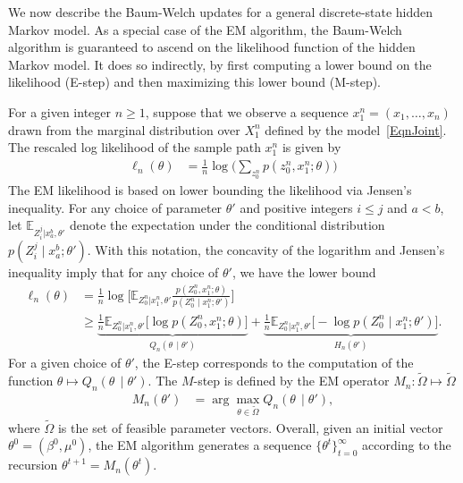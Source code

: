 \documentclass[twoside,11pt]{article}
\newcommand{\numobs}{\ensuremath{n}}
\def\EE{ \mathbb{E} }
\newcommand{\EEzcondx}[3]{\ensuremath{\EE_{#1|#2,#3}}}
\newcommand{\paramobs}{\mu}
\newcommand{\paramtrans}{\beta}
\newcommand{\paramjoint}{\theta}
\newcommand{\paramtransit}[1]{\ensuremath{\paramtrans^{#1}}}
\newcommand{\paramobsit}[1]{\ensuremath{\paramobs^{#1}}}
\newcommand{\paramjointit}[1]{\ensuremath{\theta^{#1}}}
\newcommand{\MFUNSAM}{\ensuremath{M_\numobs}}
\newcommand{\LikeSample}{\ensuremath{\ell_\numobs}}
\newcommand{\hprob}{\ensuremath{p}}
\newcommand{\QFUNSAM}[2]{\ensuremath{Q_\numobs (#1 \, \mid #2)}}
\newcommand{\DomTheta}{\ensuremath{\Omega}}
\newcommand{\DomThetaFeas}{\widetilde{\DomTheta}}
\begin{document}
We now describe the Baum-Welch updates for a general discrete-state
hidden Markov model.  As a special case of the EM algorithm, the
Baum-Welch algorithm is guaranteed to ascend on the likelihood
function of the hidden Markov model.  It does so indirectly, by first
computing a lower bound on the likelihood (E-step) and then maximizing
this lower bound (M-step).


For a given integer $\numobs \geq 1$, suppose that we observe a
sequence $x_1^\numobs = (x_1, \ldots, x_\numobs)$ drawn from the
marginal distribution over $X_1^\numobs$ defined by the
model~\eqref{EqnJoint}. The rescaled log likelihood of the sample path
$x_1^\numobs$ is given by
\begin{align*}
\LikeSample(\paramjoint) & = \frac{1}{\numobs} \log
\Big(\sum_{z_0^\numobs} \hprob(z_0^\numobs, x_1^\numobs; \paramjoint)
\Big)
\end{align*}
The EM likelihood is based on lower bounding the likelihood via
Jensen's inequality.  For any choice of parameter $\paramjoint'$ and
positive integers $i\leq j$ and $a<b$, let
$\EEzcondx{Z_i^{j}}{x_a^b}{\paramjoint'}$ denote the expectation under
the conditional distribution $p(Z_i^j \mid x_a^b; \paramjoint')$.
With this notation, the concavity of the logarithm and Jensen's
inequality imply that for any choice of $\paramjoint'$, we have the
lower bound
\begin{align*}
\LikeSample(\paramjoint) &= \frac{1}{\numobs} \log \big[
  \EEzcondx{Z_0^{\numobs}}{x_1^{\numobs}}{\paramjoint'}
  \frac{p(Z_0^{\numobs}, x_1^{\numobs}; \paramjoint)}{p(Z_0^{\numobs}
    \mid x_1^{\numobs}; \paramjoint') } \big] \\
%
& \geq \underbrace{\frac{1}{\numobs}
  \EEzcondx{Z_0^{\numobs}}{x_1^\numobs}{\paramjoint'} \big[ \log
    p(Z_0^\numobs,x_1^\numobs; \paramjoint)
    \big]}_{\QFUNSAM{\paramjoint}{\paramjoint'}} +
\underbrace{\frac{1}{\numobs}
  \EEzcondx{Z_0^{\numobs}}{x_1^\numobs}{\paramjoint'} \big[ -\log
    p(Z_0^\numobs \mid x_1^\numobs;
    \paramjoint')]}_{H_\numobs(\paramjoint')}.
\end{align*}
For a given choice of $\paramjoint'$, the E-step corresponds to the
computation of the function \mbox{$\paramjoint \mapsto
  \QFUNSAM{\paramjoint}{\paramjoint'}$.}  The $M$-step is defined by
the EM operator $\MFUNSAM: \DomThetaFeas \mapsto \DomThetaFeas$
\begin{align}
\label{EqnEMOperator}
\MFUNSAM(\paramjoint') & = \arg \max_{\theta \in \DomThetaFeas}
\QFUNSAM{\paramjoint}{\paramjoint'},
\end{align}
where $\DomThetaFeas$ is the set of feasible parameter vectors.  Overall,
given an initial vector $\paramjointit{0} = (\paramtransit{0},
\paramobsit{0})$, the EM algorithm generates a sequence
$\{\paramjointit{t}\}_{t=0}^\infty$ according to the recursion
$\paramjointit{t+1} = \MFUNSAM(\paramjointit{t})$.
\end{document}
